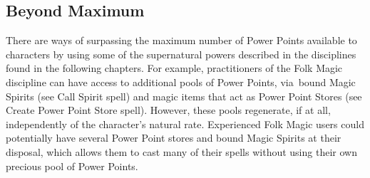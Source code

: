 \subsection{Beyond Maximum}
There are ways of surpassing the maximum number of Power Points available to characters by using some of the supernatural powers described in the disciplines found in the following chapters. For example, practitioners of the Folk Magic discipline can have access to additional pools of Power Points, via bound Magic Spirits (see Call Spirit spell) and magic items that act as Power Point Stores (see Create Power Point Store spell). However, these pools regenerate, if at all, independently of the character’s natural rate. Experienced Folk Magic users could potentially have several Power Point stores and bound Magic Spirits at their disposal, which allows them to cast many of their spells without using their own precious pool of Power Points.


